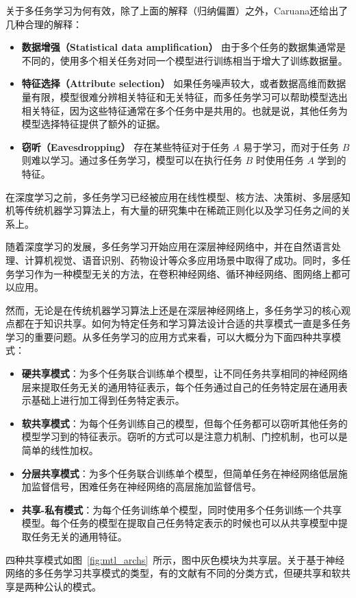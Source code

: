 关于多任务学习为何有效，除了上面的解释（归纳偏置）之外，Caruana还给出了几种合理的解释\cite{Caruana1997}：

\begin{itemize}
	\item \textbf{数据增强（Statistical data amplification）} 由于多个任务的数据集通常是不同的，使用多个相关任务对同一个模型进行训练相当于增大了训练数据量。
	\item \textbf{特征选择（Attribute selection）} 如果任务噪声较大，或者数据高维而数据量有限，模型很难分辨相关特征和无关特征，而多任务学习可以帮助模型选出相关特征，因为这些特征通常在多个任务中是共用的。也就是说，其他任务为模型选择特征提供了额外的证据。
	\item \textbf{窃听（Eavesdropping）} 存在某些特征对于任务 $A$ 易于学习，而对于任务 $B$ 则难以学习。通过多任务学习，模型可以在执行任务 $B$ 时使用任务 $A$ 学到的特征。
\end{itemize}

在深度学习之前，多任务学习已经被应用在线性模型、核方法、决策树、多层感知机等传统机器学习算法上，有大量的研究集中在稀疏正则化\cite{DBLP:conf/nips/ArgyriouEP06}\cite{DBLP:conf/colt/LouniciPTG09}以及学习任务之间的关系\cite{DBLP:journals/jmlr/EvgeniouMP05}\cite{DBLP:conf/nips/JacobBV08}上。

随着深度学习的发展，多任务学习开始应用在深层神经网络中，并在自然语言处理\cite{DBLP:conf/icml/CollobertW08}、计算机视觉\cite{DBLP:conf/cvpr/MisraSGH16}、语音识别\cite{DBLP:conf/icassp/DengHK13}、药物设计\cite{DBLP:journals/corr/RamsundarKRWKP15}等众多应用场景中取得了成功。同时，多任务学习作为一种模型无关的方法，在卷积神经网络\cite{DBLP:conf/icml/CollobertW08}\cite{DBLP:conf/cvpr/MisraSGH16}、循环神经网络\cite{DBLP:conf/ijcai/LiuQH16}、图网络\cite{liu2018multi}上都可以应用。

然而，无论是在传统机器学习算法上还是在深层神经网络上，多任务学习的核心观点都在于知识共享。如何为特定任务和学习算法设计合适的共享模式一直是多任务学习的重要问题。从多任务学习的应用方式来看，可以大概分为下面四种共享模式\cite{book:nndl}：

\begin{itemize}
	\item \textbf{硬共享模式}：为多个任务联合训练单个模型，让不同任务共享相同的神经网络层来提取任务无关的通用特征表示，每个任务通过自己的任务特定层在通用表示基础上进行加工得到任务特定表示。
	\item \textbf{软共享模式}：为每个任务训练自己的模型，但每个任务都可以窃听其他任务的模型学习到的特征表示。窃听的方式可以是注意力机制、门控机制，也可以是简单的线性加权。
	\item \textbf{分层共享模式}：为多个任务联合训练单个模型，但简单任务在神经网络低层施加监督信号，困难任务在神经网络的高层施加监督信号。
	\item \textbf{共享-私有模式}：为每个任务训练单个模型，同时使用多个任务训练一个共享模型。每个任务的模型在提取自己任务特定表示的时候也可以从共享模型中提取任务无关的通用特征。
\end{itemize}
四种共享模式如图~\ref{fig:mtl_archs}~所示，图中灰色模块为共享层。关于基于神经网络的多任务学习共享模式的类型，有的文献\cite{ruder2017overview}\cite{DBLP:conf/iclr/MeyersonM18}有不同的分类方式，但硬共享和软共享是两种公认的模式。

